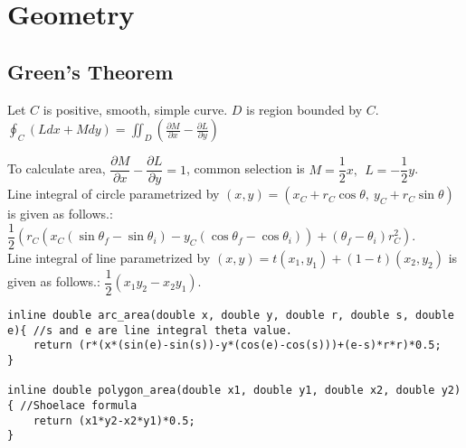 \documentclass[landscape, 10pt, a4paper, oneside,  twocolumn]{article}
\begin{document}
\section{Geometry}

\subsection{Green's Theorem}
Let $C$ is positive, smooth, simple curve. $D$ is region bounded by $C$. \\

{
\large
$\oint_C (L dx + M dy)  = \iint_D (\frac{\partial M}{\partial x} - \frac{\partial L}{\partial y}) $ \\
}

To calculate area, $\dfrac{\partial M}{\partial x} - \dfrac{\partial L}{\partial y} = 1$, common selection is $M = \dfrac{1}{2} x, \ \ L = -\dfrac{1}{2} y$. \\

Line integral of circle parametrized by $(x, y) = (x_C + r_C \cos \theta, \ y_C + r_C \sin \theta)$ is given as follows.:  $\dfrac{1}{2}( r_C (x_C (\sin \theta_f - \sin \theta_i) - y_C (\cos \theta_f - \cos \theta_i) ) + (\theta_f - \theta_i) r_C ^ 2)$. \\

Line integral of line parametrized by $(x, y) = t(x_1, y_1) + (1-t)(x_2, y_2)$ is given as follows.: $\dfrac{1}{2} (x_1 y_2 - x_2 y_1)$.

\begin{verbatim}
inline double arc_area(double x, double y, double r, double s, double e){ //s and e are line integral theta value.
	return (r*(x*(sin(e)-sin(s))-y*(cos(e)-cos(s)))+(e-s)*r*r)*0.5;
}

inline double polygon_area(double x1, double y1, double x2, double y2){ //Shoelace formula 
	return (x1*y2-x2*y1)*0.5;
}
\end{verbatim}
\end{document}
